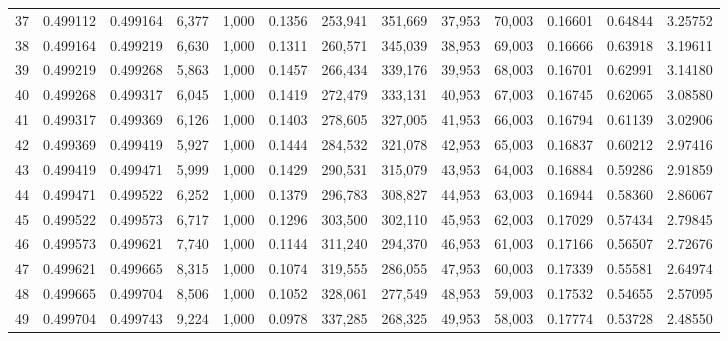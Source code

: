 \begin{tabular}{rrrrrrrrrrrrr}
37  &  0.499112 &  0.499164 &  6,377 &  1,000 &                                     0.1356 &  253,941 &  351,669 &   37,953 &   70,003 &  0.16601 &  0.64844 &  3.25752 \\
38  &  0.499164 &  0.499219 &  6,630 &  1,000 &                                     0.1311 &  260,571 &  345,039 &   38,953 &   69,003 &  0.16666 &  0.63918 &  3.19611 \\
39  &  0.499219 &  0.499268 &  5,863 &  1,000 &                                     0.1457 &  266,434 &  339,176 &   39,953 &   68,003 &  0.16701 &  0.62991 &  3.14180 \\
40  &  0.499268 &  0.499317 &  6,045 &  1,000 &                                     0.1419 &  272,479 &  333,131 &   40,953 &   67,003 &  0.16745 &  0.62065 &  3.08580 \\
41  &  0.499317 &  0.499369 &  6,126 &  1,000 &                                     0.1403 &  278,605 &  327,005 &   41,953 &   66,003 &  0.16794 &  0.61139 &  3.02906 \\
42  &  0.499369 &  0.499419 &  5,927 &  1,000 &                                     0.1444 &  284,532 &  321,078 &   42,953 &   65,003 &  0.16837 &  0.60212 &  2.97416 \\
43  &  0.499419 &  0.499471 &  5,999 &  1,000 &                                     0.1429 &  290,531 &  315,079 &   43,953 &   64,003 &  0.16884 &  0.59286 &  2.91859 \\
44  &  0.499471 &  0.499522 &  6,252 &  1,000 &                                     0.1379 &  296,783 &  308,827 &   44,953 &   63,003 &  0.16944 &  0.58360 &  2.86067 \\
45  &  0.499522 &  0.499573 &  6,717 &  1,000 &                                     0.1296 &  303,500 &  302,110 &   45,953 &   62,003 &  0.17029 &  0.57434 &  2.79845 \\
46  &  0.499573 &  0.499621 &  7,740 &  1,000 &                                     0.1144 &  311,240 &  294,370 &   46,953 &   61,003 &  0.17166 &  0.56507 &  2.72676 \\
47  &  0.499621 &  0.499665 &  8,315 &  1,000 &                                     0.1074 &  319,555 &  286,055 &   47,953 &   60,003 &  0.17339 &  0.55581 &  2.64974 \\
48  &  0.499665 &  0.499704 &  8,506 &  1,000 &                                     0.1052 &  328,061 &  277,549 &   48,953 &   59,003 &  0.17532 &  0.54655 &  2.57095 \\
49  &  0.499704 &  0.499743 &  9,224 &  1,000 &                                     0.0978 &  337,285 &  268,325 &   49,953 &   58,003 &  0.17774 &  0.53728 &  2.48550 \\

\end{tabular}
